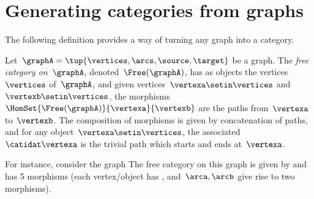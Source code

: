 
\section[Categories from graphs]{Generating categories from graphs}
\label{sec:catsfromgraphs}

The following definition provides a way of turning any graph into a category.

\begin{ctdefinition}
    \label{def:free-category}
    Let~$\graphA=\tup{\vertices,\arcs,\source,\target}$ be a graph.
    The \emph{free category on~$\graphA$}, denoted~$\Free(\graphA)$, has as objects the vertices~$\vertices$ of~$\graphA$, and given vertices~$\vertexa\setin \vertices$ and~$\vertexb\setin \vertices$, the morphisms~$\HomSet{\Free(\graphA)}{\vertexa}{\vertexb}$ are the paths from~$\vertexa$ to~$\vertexb$.
    The composition of morphisms is given by concatenation of paths, and for any object~$\vertexa \setin \vertices$, the associated ~$\catidat\vertexa$ is the trivial path which starts and ends at~$\vertexa$.
\end{ctdefinition}

For instance, consider the graph
The free category on this graph is given by
and has 5 morphisms (each vertex/object has , and~$\arca,\arcb$ give rise to two morphisms).

